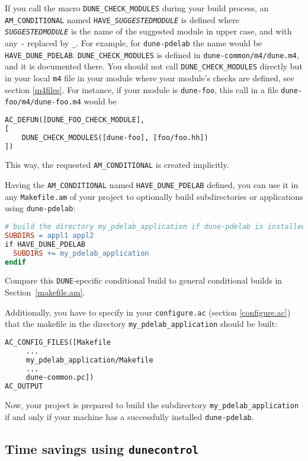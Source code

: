 \documentclass[11pt,a4paper,headinclude,footinclude,DIV16,normalheadings]{scrartcl}
\newcommand{\dune}{\texttt{DUNE}\xspace}
\newcommand{\dunecontrol}{\texttt{dunecontrol}\xspace}
\begin{document}
If you call the macro \texttt{DUNE\_CHECK\_MODULES} during your build process, 
an \texttt{AM\_CONDITIONAL} named \texttt{HAVE\_\textit{SUGGESTEDMODULE}} is defined where
\texttt{\textit{SUGGESTEDMODULE}} is the name of the suggested module in upper case, and
with any \texttt{-} replaced by \texttt{\_}. For example, for \texttt{dune-pdelab} the
name would be \texttt{HAVE\_DUNE\_PDELAB}. \texttt{DUNE\_CHECK\_MODULES}
is defined in \texttt{dune-common/m4/dune.m4}, and it is documented there.
You should not call \texttt{DUNE\_CHECK\_MODULES} directly but in your local
\texttt{m4} file in your module where your module's checks are defined,
see section \ref{m4files}. For instance, if your module is \texttt{dune-foo},
this call in a file \texttt{dune-foo/m4/dune-foo.m4} would be
\begin{lstlisting}[language=make]
AC_DEFUN([DUNE_FOO_CHECK_MODULE],
[
    DUNE_CHECK_MODULES([dune-foo], [foo/foo.hh])
])
\end{lstlisting}
This way, the requested \texttt{AM\_CONDITIONAL} is created implicitly.

Having the \texttt{AM\_CONDITIONAL} named \texttt{HAVE\_DUNE\_PDELAB}
defined, you can use it in any \texttt{Makefile.am} of your project
to optionally build subdirectories or applications using \texttt{dune-pdelab}:
\begin{lstlisting}[language=make]
# build the directory my_pdelab_application if dune-pdelab is installed
SUBDIRS = appl1 appl2
if HAVE_DUNE_PDELAB
  SUBDIRS += my_pdelab_application
endif
\end{lstlisting}
Compare this \dune-specific conditional build to general conditional builds in 
Section~\ref{makefile.am}.

Additionally, you have to specify in your \texttt{configure.ac}
(section \ref{configure.ac}) that the makefile in the directory
\texttt{my\_pdelab\_application} should be built:
\begin{lstlisting}[language=make]
AC_CONFIG_FILES([Makefile
     ...
     my_pdelab_application/Makefile
     ...
     dune-common.pc])
AC_OUTPUT
\end{lstlisting}
Now, your project is prepared to build the subdirectory
\texttt{my\_pdelab\_application} if and only if your machine has a successfully
installed \texttt{dune-pdelab}.

\subsection{Time savings using \dunecontrol}
\end{document}
